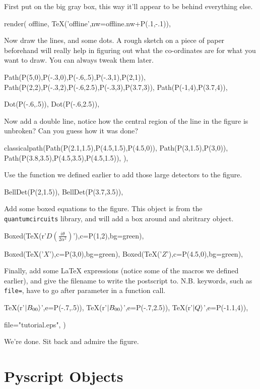 \documentclass[a4paper]{book}
\begin{document}
First put on the big gray box, this way
it'll appear to be behind everything else.
\begin{python}
render(
    offline,
    TeX('offline',nw=offline.nw+P(.1,-.1)),
\end{python}
Now draw the lines, and some dots. A rough sketch on a piece of paper
beforehand will really help in figuring out what the co-ordinates are
for what you want to draw. You can always tweak them later.
\begin{python}
    Path(P(5,0),P(-.3,0),P(-.6,.5),P(-.3,1),P(2,1)),
    Path(P(2,2),P(-.3,2),P(-.6,2.5),P(-.3,3),P(3.7,3)),
    Path(P(-1,4),P(3.7,4)),

    Dot(P(-.6,.5)),
    Dot(P(-.6,2.5)),
\end{python}
Now add a double line, notice how the central region of the line in
the figure is unbroken? Can you guess how it was done?
\begin{python}
    classicalpath(Path(P(2.1,1.5),P(4.5,1.5),P(4.5,0)),
                  Path(P(3,1.5),P(3,0)),
                  Path(P(3.8,3.5),P(4.5,3.5),P(4.5,1.5)),
                  ),
\end{python}
Use the function we defined earlier to add those large detectors to the figure.
\begin{python}
    BellDet(P(2,1.5)),
    BellDet(P(3.7,3.5)),
\end{python}
Add some boxed equations to the figure. This object is from the
\Verb|quantumcircuits| library, and will add a box around and
abritrary object.
\begin{python}
    Boxed(TeX(r'$D\left(\frac{i\theta}{2\alpha^2}\right)$'),c=P(1,2),bg=green),

    Boxed(TeX('$X$'),c=P(3,0),bg=green),
    Boxed(TeX('$Z$'),c=P(4.5,0),bg=green),
\end{python}
Finally, add some \LaTeX{} expressions (notice some of the macros we
defined earlier), and give the filename to write the postscript to.
N.B.  keywords, such as \Verb|file=|, have to go after parameter in a
function call.
\begin{python}
    TeX(r'$\mbox{$|B_{00}\rangle$}$',e=P(-.7,.5)),
    TeX(r'$\mbox{$|B_{00}\rangle$}$',e=P(-.7,2.5)),
    TeX(r'$\mbox{$|Q\rangle$}$',e=P(-1.1,4)),

    file="tutorial.eps",
    )
\end{python}

We're done. Sit back and admire the figure.
\chapter{Pyscript Objects}
\label{cha:base-objects}
\end{document}
